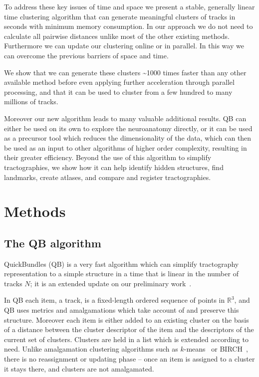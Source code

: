 \documentclass[preprint,authoryear,a4paper,10pt,onecolumn]{elsarticle}
\begin{document}
To address these key issues of time and space we present a stable,
generally linear time clustering algorithm that can generate meaningful
clusters of tracks in seconds with minimum memory consumption. In our
approach we do not need to calculate all pairwise distances unlike most
of the other existing methods. Furthermore we can update our clustering
online or in parallel. In this way we can overcome the previous barriers
of space and time.

We show that we can generate these clusters \textasciitilde1000 times faster than
any other available method before even applying further
acceleration through parallel processing, and that it can be used to
cluster from a few hundred to many millions of tracks.

Moreover our new algorithm leads to many valuable additional results. QB
can either be used on its own to explore the neuroanatomy directly, or
it can be used as a precursor tool which reduces the dimensionality of
the data, which can then be used as an input to other algorithms of
higher order complexity, resulting in their greater efficiency. Beyond
the use of this algorithm to simplify tractographies, we show how it can
help identify hidden structures, find landmarks, create atlases, and
compare and register tractographies.

\section{Methods}

\subsection{The QB algorithm\label{sub:QB-description}}

QuickBundles (QB) is a very fast algorithm which can simplify
tractography representation to a simple structure in a time that is
linear in the number of tracks $N$; it is an extended update on our
preliminary work~\citep{EGMB10}.

In QB each item, a track, is a fixed-length ordered sequence of points
in $\mathbb{R}^{3}$, and QB uses metrics and amalgamations which take
account of and preserve this structure.  Moreover each item is either
added to an existing cluster on the basis of a distance between the
cluster descriptor of the item and the descriptors of the current set of
clusters. Clusters are held in a list which is extended according to
need. Unlike amalgamation clustering algorithms such as
$k$-means~\citep{steinhaus1956division, macqueen1967some} or
BIRCH~\citep{zhang1997birch}, there is no reassignment or updating phase
-- once an item is assigned to a cluster it stays there, and clusters
are not amalgamated. 
\end{document}

